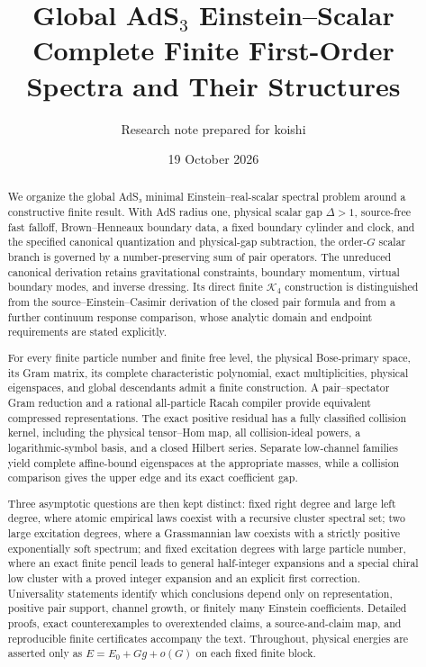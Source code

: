 \documentclass[a4paper,11pt]{article}
\numberwithin{equation}{section}
\begin{document}
\title{\textbf{Global AdS$_3$ Einstein--Scalar}\\[5pt]
\large Complete Finite First-Order Spectra and Their Structures}
\author{Research note prepared for koishi}
\date{19 October 2026}
\maketitle

\begin{abstract}
We organize the global AdS₃ minimal Einstein--real-scalar spectral problem around a constructive finite result. With AdS radius one, physical scalar gap \(\Delta>1\), source-free fast falloff, Brown--Henneaux boundary data, a fixed boundary cylinder and clock, and the specified canonical quantization and physical-gap subtraction, the order-\(G\) scalar branch is governed by a number-preserving sum of pair operators. The unreduced canonical derivation retains gravitational constraints, boundary momentum, virtual boundary modes, and inverse dressing. Its direct finite \(\mathcal K_4\) construction is distinguished from the source--Einstein--Casimir derivation of the closed pair formula and from a further continuum response comparison, whose analytic domain and endpoint requirements are stated explicitly.

For every finite particle number and finite free level, the physical Bose-primary space, its Gram matrix, its complete characteristic polynomial, exact multiplicities, physical eigenspaces, and global descendants admit a finite construction. A pair--spectator Gram reduction and a rational all-particle Racah compiler provide equivalent compressed representations. The exact positive residual has a fully classified collision kernel, including the physical tensor--Hom map, all collision-ideal powers, a logarithmic-symbol basis, and a closed Hilbert series. Separate low-channel families yield complete affine-bound eigenspaces at the appropriate masses, while a collision comparison gives the upper edge and its exact coefficient gap.

Three asymptotic questions are then kept distinct: fixed right degree and large left degree, where atomic empirical laws coexist with a recursive cluster spectral set; two large excitation degrees, where a Grassmannian law coexists with a strictly positive exponentially soft spectrum; and fixed excitation degrees with large particle number, where an exact finite pencil leads to general half-integer expansions and a special chiral low cluster with a proved integer expansion and an explicit first correction. Universality statements identify which conclusions depend only on representation, positive pair support, channel growth, or finitely many Einstein coefficients. Detailed proofs, exact counterexamples to overextended claims, a source-and-claim map, and reproducible finite certificates accompany the text. Throughout, physical energies are asserted only as \(E=E_0+Gg+o(G)\) on each fixed finite block.

\end{abstract}
\end{document}
